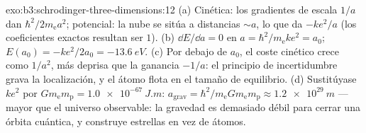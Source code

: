 \begin{solution}{exo:b3:schrodinger-three-dimensions:12}
(a) Cinética: los gradientes de escala $1/a$ dan $\hbar^2/2m_{\text{e}}
a^2$; potencial: la nube se sitúa a distancias $\sim a$, lo que da
$-ke^2/a$ (los coeficientes exactos resultan ser $1$). (b) $\dd E/\dd
a = 0$ en $a = \hbar^2/m_{\text{e}}ke^2 = a_0$; $E(a_0) =
-ke^2/2a_0 = \qty{-13.6}{eV}$. (c) Por debajo de $a_0$, el coste cinético
crece como $1/a^2$, más deprisa que la ganancia $-1/a$: el principio de
incertidumbre grava la localización, y el átomo flota en el tamaño de
equilibrio. (d) Sustitúyase $ke^2$ por $Gm_{\text{e}}m_{\text{p}} =
\qty{1.0e-67}{J.m}$: $a_{\text{grav}} = \hbar^2/m_{\text{e}}G
m_{\text{e}}m_{\text{p}} \approx \qty{1.2e29}{m}$ --- mayor que
el universo observable: la gravedad es demasiado débil para cerrar una
órbita cuántica, y construye estrellas en vez de átomos.
\end{solution}

